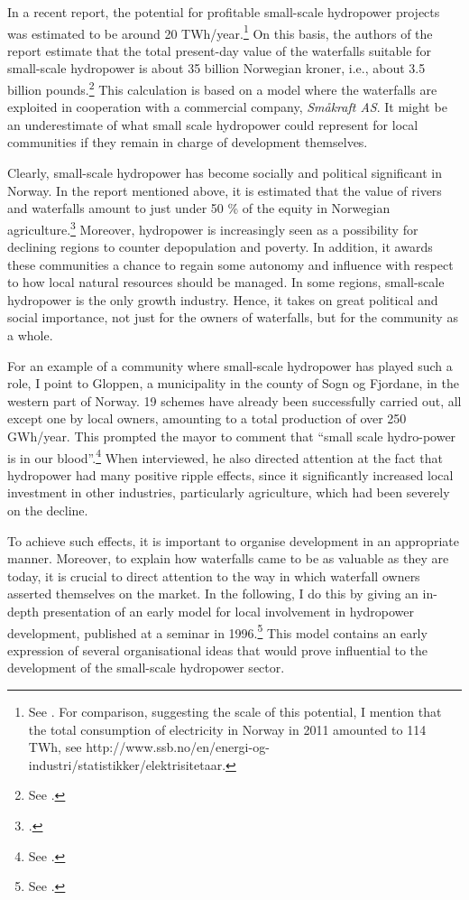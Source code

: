 In a recent report, the potential for profitable small-scale hydropower projects was estimated to be around 20 TWh/year.\footnote{See \cite{aanesland09}. For comparison, suggesting the scale of this potential, I mention that the total consumption of electricity in Norway in 2011 amounted to 114 TWh, see http://www.ssb.no/en/energi-og-industri/statistikker/elektrisitetaar.} On this basis, the authors of the report estimate that the total present-day value of the waterfalls suitable for small-scale hydropower is about 35 billion Norwegian kroner, i.e., about 3.5 billion pounds.\footnote{See \cite[1]{aanesland09}.} This calculation is based on a model where the waterfalls are exploited in cooperation with a commercial company, {\it Småkraft AS}. It might be an underestimate of what small scale hydropower could represent for local communities if they remain in charge of development themselves.

Clearly, small-scale hydropower has become socially and political significant in Norway. In the report mentioned above, it is estimated that the value of rivers and waterfalls amount to just under 50 \% of the equity in Norwegian agriculture.\footcite[1]{aanesland09} Moreover, hydropower is increasingly seen as a possibility for declining regions to counter depopulation and poverty. In addition, it awards these communities a chance to regain some autonomy and influence with respect to how local natural resources should be managed. In some regions, small-scale hydropower is the only growth industry. Hence, it takes on great political and social importance, not just for the owners of waterfalls, but for the community as a whole.

For an example of a community where small-scale hydropower has played such a role, I point to Gloppen, a municipality in the county of Sogn og Fjordane, in the western part of Norway. 19 schemes have already been successfully carried out, all except one by local owners, amounting to a total production of over 250 GWh/year. This prompted the mayor to comment that ``small scale hydro-power is in our blood''.\footnote{See \cite{starheim12}.} When interviewed, he also directed attention at the fact that hydropower had many positive ripple effects, since it significantly increased local investment in other industries, particularly agriculture, which had been severely on the decline.

To achieve such effects, it is important to organise development in an appropriate manner. Moreover, to explain how waterfalls came to be as valuable as they are today, it is crucial to direct attention to the way in which waterfall owners asserted themselves on the market. In the following, I do this by giving an in-depth presentation of an early model for local involvement in hydropower development, published at a seminar in 1996.\footnote{See \cite{dyrkolbotn96}.} This model contains an early expression of several organisational ideas that would prove influential to the development of the small-scale hydropower sector.

